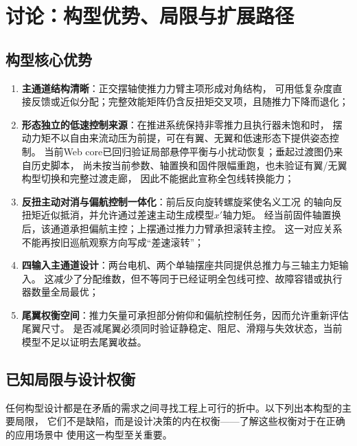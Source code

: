 \section{讨论：构型优势、局限与扩展路径}
\label{sec:discussion}

\subsection{构型核心优势}

\begin{enumerate}[label=(\arabic*)]
    \item \textbf{主通道结构清晰}：正交摆轴使推力力臂主项形成对角结构，
          可用低复杂度直接反馈或近似分配；完整效能矩阵仍含反扭矩交叉项，且随推力下降而退化；
    \item \textbf{形态独立的低速控制来源}：在推进系统保持非零推力且执行器未饱和时，
          摆动力矩不以自由来流动压为前提，可在有翼、无翼和低速形态下提供姿态控制。
          当前Web core已回归验证局部悬停平衡与小扰动恢复；垂起过渡图仍来自历史脚本，
          尚未按当前参数、轴置换和固件限幅重跑，也未验证有翼/无翼构型切换和完整过渡走廊，
          因此不能据此宣称全包线转换能力；
    \item \textbf{反扭主动对消与偏航控制一体化}：前后反向旋转螺旋桨使名义工况
          的轴向反扭矩近似抵消，并允许通过差速主动生成模型$x'$轴力矩。
          经当前固件轴置换后，该通道承担偏航主控；上摆通过推力力臂承担滚转主控。
          这一对应关系不能再按旧巡航观察方向写成“差速滚转”；
    \item \textbf{四输入主通道设计}：两台电机、两个单轴摆座共同提供总推力与三轴主力矩输入。
          这减少了分配维数，但不等同于已经证明全包线可控、故障容错或执行器数量全局最优；
    \item \textbf{尾翼权衡空间}：推力矢量可承担部分俯仰和偏航控制任务，因而允许重新评估尾翼尺寸。
          是否减尾翼必须同时验证静稳定、阻尼、滑翔与失效状态，当前模型不足以证明去尾翼收益。
\end{enumerate}

\subsection{已知局限与设计权衡}

任何构型设计都是在矛盾的需求之间寻找工程上可行的折中。以下列出本构型的主要局限，
它们不是缺陷，而是设计决策的内在权衡——了解这些权衡对于在正确的应用场景中
使用这一构型至关重要。

